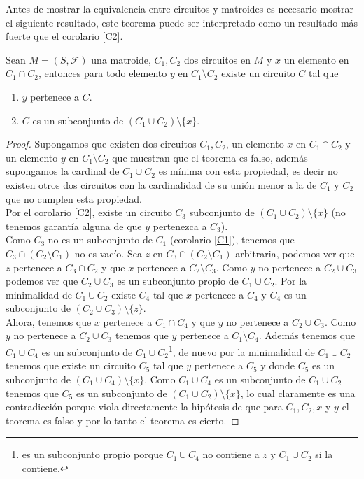 Antes de mostrar la equivalencia entre circuitos y matroides es necesario mostrar el siguiente resultado, este teorema puede ser interpretado como un resultado más fuerte que el corolario \ref{C2}.

\begin{teo} \label{C3}
Sean $M=(S,\mathcal{F})$ una matroide, $C_1, C_2$ dos circuitos en $M$ y $x$ un elemento en $C_1 \cap C_2$, entonces para todo elemento $y$ en $C_1 \setminus C_2$ existe un circuito $C$ tal que 
\begin{enumerate}
\item $y$ pertenece a $C$.
\item $C$ es un subconjunto de $(C_1 \cup C_2) \setminus \{x\}$.
\end{enumerate}
\end{teo}

\begin{proof}
Supongamos que existen dos circuitos $C_1,C_2$, un elemento $x$ en $C_1 \cap C_2$ y un elemento $y$ en $C_1 \setminus C_2$ que muestran que el teorema es falso, además supongamos la cardinal de $C_1 \cup C_2$ es mínima con esta propiedad, es decir no existen otros dos circuitos con la cardinalidad de su unión menor a la de $C_1$ y $C_2$ que no cumplen esta propiedad. \\
Por el corolario \ref{C2}, existe un circuito $C_3$ subconjunto de $(C_1 \cup C_2)\setminus \{x\}$ (no tenemos garantía alguna de que $y$ pertenezca a $C_3$). \\
Como $C_3$ no es un subconjunto de $C_1$ (corolario \ref{C1}), tenemos que $C_3 \cap (C_2\setminus C_1)$ no es vacío. Sea $z$ en $C_3 \cap (C_2\setminus C_1)$ arbitraria, podemos ver que $z$ pertenece a $C_3 \cap C_2$ y que $x$ pertenece a $C_2 \setminus C_3$. Como $y$ no pertenece a $C_2 \cup C_3$ podemos ver que $C_2 \cup C_3$ es un subconjunto propio de $C_1 \cup C_2$. Por la minimalidad de $C_1 \cup C_2$ existe $C_4$ tal que $x$ pertenece a $C_4$ y $C_4$ es un subconjunto de $(C_2 \cup C_3) \setminus \{z\}$. \\
Ahora, tenemos que $x$ pertenece a $C_1 \cap C_4$ y que $y$ no pertenece a $C_2 \cup C_3$. Como $y$ no pertenece a $C_2 \cup C_3$ tenemos que $y$ pertenece a $C_1 \setminus C_4$. Además tenemos que $C_1 \cup C_4$ es un subconjunto de $C_1 \cup C_2$\footnote{es un subconjunto propio porque $C_1 \cup C_4$ no contiene a $z$ y $C_1 \cup C_2$ si la contiene.}, de nuevo por la minimalidad de $C_1 \cup C_2$ tenemos que existe un circuito $C_5$ tal que $y$ pertenece a $C_5$ y donde $C_5$ es un subconjunto de $(C_1 \cup C_4) \setminus \{x\}$. Como $C_1 \cup C_4$ es un subconjunto de $C_1 \cup C_2$ tenemos que $C_5$ es un subconjunto de $(C_1 \cup C_2) \setminus \{x\}$, lo cual claramente es una contradicción porque viola directamente la hipótesis de que para $C_1,C_2,x$ y $y$ el teorema es falso y por lo tanto el teorema es cierto. 
\end{proof}


